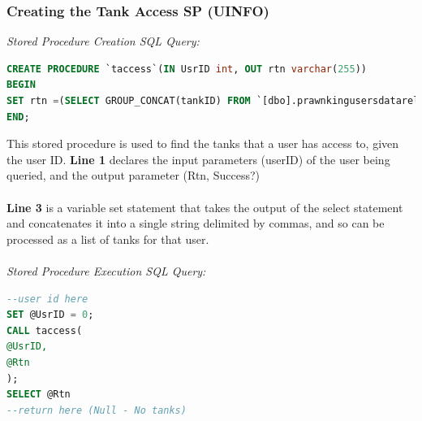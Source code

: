\documentclass[a4paper,11pt]{proc}
\begin{document}
\subsubsection{Creating the Tank Access SP (UINFO)}
\textit{Stored Procedure Creation SQL Query:}
\begin{lstlisting}[language=SQL,
deletekeywords={IDENTITY,INT},
morekeywords={clustered,OUT, BEGIN, PROCEDURE},    
framesep=10pt,
framextopmargin=10pt]
CREATE PROCEDURE `taccess`(IN UsrID int, OUT rtn varchar(255))
BEGIN
SET rtn =(SELECT GROUP_CONCAT(tankID) FROM `[dbo].prawnkingusersdatarel` WHERE userID=UsrID);
END;
\end{lstlisting}
This stored procedure is used to find the tanks that a user has access to, given the user ID. \textbf{Line 1} declares the input parameters (userID) of the user being queried, and the output parameter (Rtn, Success?)\\
\\\textbf{Line 3} is  a variable set statement that takes the output of the select statement and concatenates it into a single string delimited by commas, and so can be processed as a list of tanks for that user.\\
\\\textit{Stored Procedure Execution SQL Query:}
\begin{lstlisting}[language=SQL,
deletekeywords={IDENTITY,INT},
morekeywords={clustered,OUT, BEGIN, PROCEDURE,CALL},    
framesep=10pt,
framextopmargin=10pt]
--user id here
SET @UsrID = 0;
CALL taccess(
@UsrID,
@Rtn
);
SELECT @Rtn
--return here (Null - No tanks)
\end{lstlisting}
\end{document}
